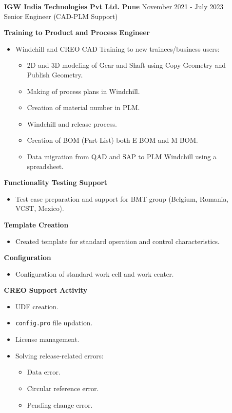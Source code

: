 \documentclass[letterpaper]{twentysecondcv} %
\begin{document}
\newpage
{}
\textbf{IGW India Technologies Pvt Ltd. Pune} \hfill November 2021 - July 2023  \\
Senior Engineer (CAD-PLM Support)
\item \textbf{Training to Product and Process Engineer}
\begin{itemize}
    \item {Windchill and CREO CAD Training} to new trainees/business users:
    \begin{itemize}
        \item 2D and 3D modeling of Gear and Shaft using Copy Geometry and Publish Geometry.
    \item Making of process plans in Windchill.
    \item Creation of material number in PLM.
    \item Windchill and release process.
    \item Creation of BOM (Part List) both E-BOM and M-BOM.
    \item Data migration from QAD and SAP to PLM Windchill using a spreadsheet.
    \end{itemize}
\end{itemize}

\item \textbf{Functionality Testing Support}
\begin{itemize}
    \item Test case preparation and support for BMT group (Belgium, Romania, VCST, Mexico).
\end{itemize}

\item \textbf{Template Creation}
\begin{itemize}
    \item Created template for standard operation and control characteristics.
\end{itemize}

\item \textbf{Configuration}
\begin{itemize}
    \item Configuration of standard work cell and work center.
\end{itemize}

\item \textbf{CREO Support Activity}
\begin{itemize}
    \item UDF creation.
    \item \texttt{config.pro} file updation.
    \item License management.
    \item Solving release-related errors:
    \begin{itemize}
        \item Data error.
        \item Circular reference error.
        \item Pending change error.
    \end{itemize}
\end{itemize}
\end{document}
